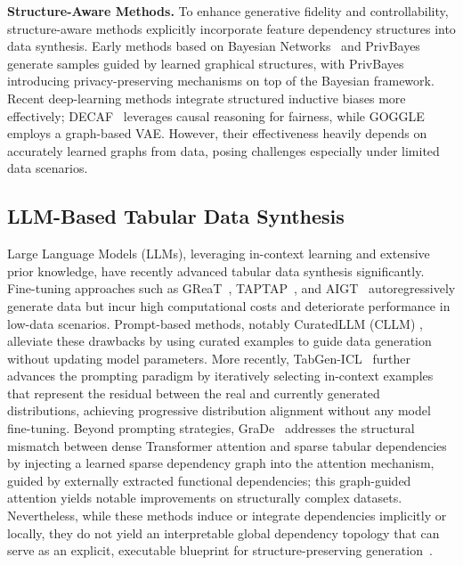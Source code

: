 \textbf{Structure-Aware Methods.} To enhance generative fidelity and controllability, structure-aware methods explicitly incorporate feature dependency structures into data synthesis. Early methods based on Bayesian Networks~\cite{ankan2015pgmpy} and PrivBayes~\cite{zhang2017privbayes} generate samples guided by learned graphical structures, with PrivBayes introducing privacy-preserving mechanisms on top of the Bayesian framework. Recent deep-learning methods integrate structured inductive biases more effectively; DECAF~\cite{van2021decaf} leverages causal reasoning for fairness, while GOGGLE~\cite{liu2023goggle} employs a graph-based VAE. However, their effectiveness heavily depends on accurately learned graphs from data, posing challenges especially under limited data scenarios.


\subsection{LLM-Based Tabular Data Synthesis}
Large Language Models (LLMs), leveraging in-context learning and extensive prior knowledge, have recently advanced tabular data synthesis significantly. Fine-tuning approaches such as GReaT~\cite{borisov2023language}, TAPTAP~\cite{zhang2023generative}, and AIGT~\cite{zhang2025aigt} autoregressively generate data but incur high computational costs and deteriorate performance in low-data scenarios. Prompt-based methods, notably CuratedLLM (CLLM) \cite{cllm2024}, alleviate these drawbacks by using curated examples to guide data generation without updating model parameters. More recently, TabGen-ICL~\cite{fang-etal-2025-tabgen} further advances the prompting paradigm by iteratively selecting in-context examples that represent the residual between the real and currently generated distributions, achieving progressive distribution alignment without any model fine-tuning. Beyond prompting strategies, GraDe~\cite{zhang-etal-2025-features} addresses the structural mismatch between dense Transformer attention and sparse tabular dependencies by injecting a learned sparse dependency graph into the attention mechanism, guided by externally extracted functional dependencies; this graph-guided attention yields notable improvements on structurally complex datasets. Nevertheless, while these methods induce or integrate dependencies implicitly or locally, they do not yield an interpretable global dependency topology that can serve as an explicit, executable blueprint for structure-preserving generation~\cite{liu2024rethinking}.





